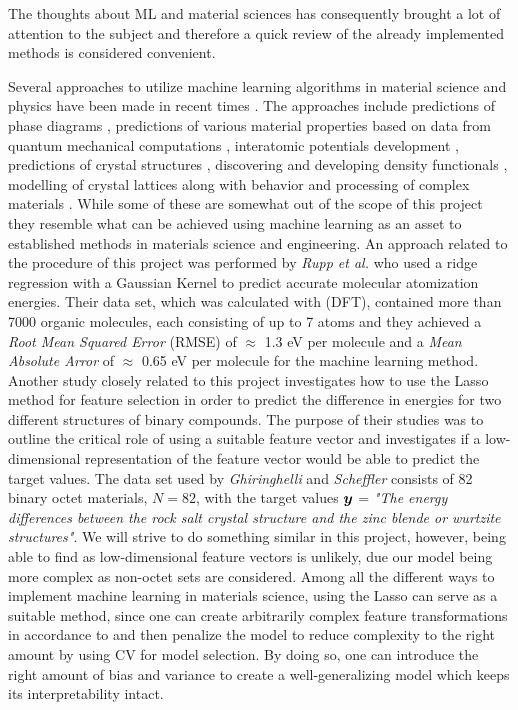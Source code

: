 The thoughts about ML and material sciences has consequently brought a lot of attention to the subject and therefore a quick review of the already implemented methods is considered convenient.


 Several approaches to utilize machine learning algorithms in material science and physics have been made in recent times \citep{mueller_kussesne,criticalrole_descriptor,frameworkforML}. The approaches include predictions of phase diagrams \citep{phasediagram,phase2diagrams}, predictions of various material properties based on data from quantum mechanical computations \citep{rupp,Pilania2013}, interatomic potentials development \citep{hansen2015a,huan2015a, bartok2010a, behler2011a, behler2007a}, predictions of crystal structures  \citep{woodley2008a,madoxx1988,fischer2006a}, discovering and developing density functionals \citep{behler2011ANN}, modelling of crystal lattices \citep{mueller2009a, mueller2012a, seko2009a} along with behavior and processing of complex materials \citep{metzbower2001a, bucholz2012a}.
While some of these are somewhat out of the scope of this project they resemble what can be achieved using machine learning as an asset to established methods in materials science and engineering. An approach related to the procedure of this project was performed by \emph{Rupp et al.} \citep{rupp} who used a ridge regression with a Gaussian Kernel to predict accurate molecular atomization energies. Their data set, which was calculated with (DFT), contained more than 7000 organic molecules, each consisting of up to 7 atoms and they achieved a \emph{Root Mean Squared Error} (RMSE) of $\approx$ 1.3 eV per molecule and a \emph{Mean Absolute Arror} of $\approx$ 0.65 eV per molecule for the machine learning method. 
Another study closely related to this project \citep{criticalrole_descriptor} investigates how to use the Lasso  method for feature selection in order to predict the difference in energies for two different structures of binary compounds. The purpose of their studies was to outline the critical role of using a suitable feature vector and investigates if a low-dimensional representation of the feature vector would be able to predict the target values. The data set used by \emph{Ghiringhelli} and \emph{Scheffler} consists of 82 binary octet materials, $N=82$, with the target values $\bm{y}$ = \emph{"The energy differences between the rock salt crystal structure and the zinc blende or wurtzite structures"}. We will strive to do something similar in this project, however, being able to find as low-dimensional feature vectors is unlikely, due our model being more complex as non-octet sets are considered. 
Among all the different ways to implement machine learning in materials science, using the Lasso can serve as a suitable method, since one can create arbitrarily complex feature transformations in accordance to  and then penalize the model to reduce complexity to the right amount by using CV for model selection. By doing so, one can introduce the right amount of bias and variance to create a well-generalizing model which keeps its interpretability intact.

